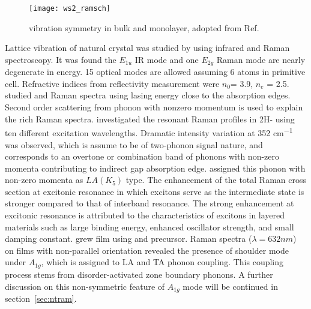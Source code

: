 \begin{figure}[htb]
\centering
\texttt{[image: ws2\_ramsch]}
\caption[ vibration symmetry]{ vibration symmetry in bulk and monolayer, adopted from Ref.\cite{Ghorbani-asl}}
\label{fig:ws2ramsch}
\end{figure}

Lattice vibration of natural  crystal was studied by \citeauthor{Wieting1971} using infrared and Raman spectroscopy.\cite{Wieting1971} It was found the $E_{1u}$ IR mode and one $E_{2g}$ Raman mode are nearly degenerate in energy. 15 optical modes are allowed assuming 6 atoms in primitive cell. Refractive indices from reflectivity measurement were $n_0$= 3.9, $n_e$ = 2.5. \citeauthor{Stacy1985} studied  and  Raman spectra using lasing energy close to the absorption edges.\cite{Stacy1985} Second order scattering from phonon with nonzero momentum is used to explain the rich Raman spectra. \citeauthor{Sourisseau1991} investigated the resonant Raman profiles in 2H- using ten different excitation wavelengths.\cite{Sourisseau1991} Dramatic intensity variation at 352 \si{cm^{-1}} was observed, which is assume to be of two-phonon signal nature, and corresponds to an overtone or combination band of phonons with non-zero momenta contributing to indirect gap absorption edge. \citeauthor{Sourisseau1991} assigned this phonon with non-zero momenta as $LA(K_5)$ type. The enhancement of the total Raman cross section at excitonic resonance in which excitons serve as the intermediate state is stronger compared to that of interband resonance. The strong enhancement at excitonic resonance is attributed to the characteristics of excitons in layered materials such as large binding energy, enhanced oscillator strength, and small damping constant.\cite{Zhao2013} \citeauthor{Chung1998} grew  film using  and  precursor.\cite{Chung1998} Raman spectra ($\lambda=632 nm$) on films with non-parallel orientation revealed the presence of shoulder mode under $A_{1g}$, which is assigned to LA and TA phonon coupling. This coupling process stems from disorder-activated zone boundary phonons. A further discussion on this non-symmetric feature of $A_{1g}$ mode will be continued in section~\ref{sec:ntram}.


